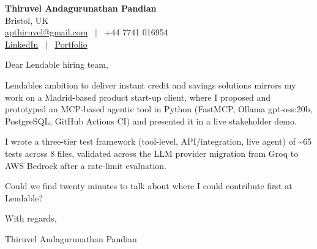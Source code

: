 \documentclass[11pt,a4paper]{article}
\begin{document}
\raggedright
\pagestyle{empty}

\begin{center}
    {\LARGE \color{linkblue} \textbf{Thiruvel Andagurunathan Pandian}}\\[0.2cm]
    Bristol, UK \\
    \href{mailto:apthiruvel@gmail.com}{apthiruvel@gmail.com} \ $|$ \ +44 7741 016954 \\
\href{https://www.linkedin.com/in/thiruvel-a-p/}{LinkedIn} \ $|$ \ \href{https://thiruvel-ap.github.io/PersonalPortfolio/}{Portfolio}
\end{center}

\vspace{0.4cm}

\noindent
Dear Lendable hiring team,

Lendable\textquotesingle{}s ambition to deliver instant credit and savings solutions mirrors my work on a Madrid-based product start-up client, where I proposed and prototyped an MCP-based agentic tool in Python (FastMCP, Ollama gpt-oss:20b, PostgreSQL, GitHub Actions CI) and presented it in a live stakeholder demo.

I wrote a three-tier test framework (tool-level, API/integration, live agent) of \textasciitilde{}65 tests across 8 files, validated across the LLM provider migration from Groq to AWS Bedrock after a rate-limit evaluation.

Could we find twenty minutes to talk about where I could contribute first at Lendable?

\vspace{0.5cm}

With regards,

Thiruvel Andagurunathan Pandian
\end{document}

